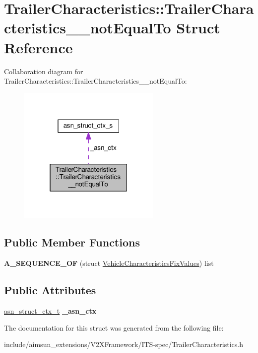 \hypertarget{structTrailerCharacteristics_1_1TrailerCharacteristics____notEqualTo}{}\section{Trailer\+Characteristics\+:\+:Trailer\+Characteristics\+\_\+\+\_\+not\+Equal\+To Struct Reference}
\label{structTrailerCharacteristics_1_1TrailerCharacteristics____notEqualTo}


Collaboration diagram for Trailer\+Characteristics\+:\+:Trailer\+Characteristics\+\_\+\+\_\+not\+Equal\+To\+:\nopagebreak
\begin{figure}[H]
\begin{center}
\leavevmode
\includegraphics[width=196pt]{structTrailerCharacteristics_1_1TrailerCharacteristics____notEqualTo__coll__graph}
\end{center}
\end{figure}
\subsection*{Public Member Functions}
\begin{DoxyCompactItemize}
\item 
{\bfseries A\+\_\+\+S\+E\+Q\+U\+E\+N\+C\+E\+\_\+\+OF} (struct \hyperlink{structVehicleCharacteristicsFixValues}{Vehicle\+Characteristics\+Fix\+Values}) list\hypertarget{structTrailerCharacteristics_1_1TrailerCharacteristics____notEqualTo_a906cd8ace87dcf2bca7f3d18d9d91ac2}{}\label{structTrailerCharacteristics_1_1TrailerCharacteristics____notEqualTo_a906cd8ace87dcf2bca7f3d18d9d91ac2}

\end{DoxyCompactItemize}
\subsection*{Public Attributes}
\begin{DoxyCompactItemize}
\item 
\hyperlink{structasn__struct__ctx__s}{asn\+\_\+struct\+\_\+ctx\+\_\+t} {\bfseries \+\_\+asn\+\_\+ctx}\hypertarget{structTrailerCharacteristics_1_1TrailerCharacteristics____notEqualTo_ab023ba399007e04945523111ad3d5565}{}\label{structTrailerCharacteristics_1_1TrailerCharacteristics____notEqualTo_ab023ba399007e04945523111ad3d5565}

\end{DoxyCompactItemize}


The documentation for this struct was generated from the following file\+:\begin{DoxyCompactItemize}
\item 
include/aimsun\+\_\+extensions/\+V2\+X\+Framework/\+I\+T\+S-\/spec/Trailer\+Characteristics.\+h\end{DoxyCompactItemize}
